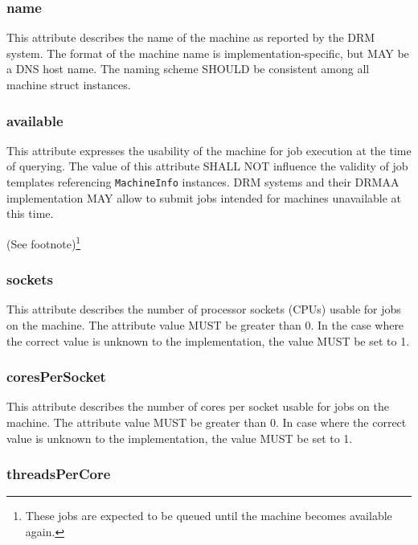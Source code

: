 \documentclass{article}
\newcommand{\h}[1]{\lstinline|#1|}
\newcommand{\rat}[1]{ {\tiny(See footnote)}\footnote{#1} }
\begin{document}


\subsubsection{name}

This attribute describes the name of the machine as reported by the DRM system. The format of the machine name is implementation-specific, but MAY be a DNS host name. The naming scheme SHOULD be consistent among all machine struct instances. 

\subsubsection{available}

This attribute expresses the usability of the machine for job execution at the time of querying. The value of this attribute SHALL NOT influence the validity of job templates referencing \h{MachineInfo} instances. DRM systems and their DRMAA implementation MAY allow to submit jobs intended for machines unavailable at this time.

\rat{These jobs are expected to be queued until the machine becomes available again.}  

\subsubsection{sockets}
\label{sec:sockets}

This attribute describes the number of processor sockets (CPUs) usable for jobs on the machine. The attribute value MUST be greater than 0. In the case where the correct value is unknown to the implementation, the value MUST be set to 1.

\subsubsection{coresPerSocket}
\label{sec:cores}

This attribute describes the number of cores per socket usable for jobs on the machine. The attribute value MUST be greater than 0. In case where the correct value is unknown to the implementation, the value MUST be set to 1.

\subsubsection{threadsPerCore}
\end{document}
